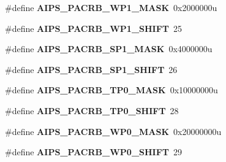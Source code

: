 \begin{DoxyCompactItemize}
\item 
\hypertarget{group___a_i_p_s___register___masks_gadd63112c58fb22cde7130bf7a0aec3d2}{}\#define {\bfseries A\+I\+P\+S\+\_\+\+P\+A\+C\+R\+B\+\_\+\+W\+P1\+\_\+\+M\+A\+S\+K}~0x2000000u\label{group___a_i_p_s___register___masks_gadd63112c58fb22cde7130bf7a0aec3d2}

\item 
\hypertarget{group___a_i_p_s___register___masks_ga3b3e2ec4b285ab5b5ce6667a05ef7ad1}{}\#define {\bfseries A\+I\+P\+S\+\_\+\+P\+A\+C\+R\+B\+\_\+\+W\+P1\+\_\+\+S\+H\+I\+F\+T}~25\label{group___a_i_p_s___register___masks_ga3b3e2ec4b285ab5b5ce6667a05ef7ad1}

\item 
\hypertarget{group___a_i_p_s___register___masks_gaf2eb0bc5160930c4b4e1a45f98267785}{}\#define {\bfseries A\+I\+P\+S\+\_\+\+P\+A\+C\+R\+B\+\_\+\+S\+P1\+\_\+\+M\+A\+S\+K}~0x4000000u\label{group___a_i_p_s___register___masks_gaf2eb0bc5160930c4b4e1a45f98267785}

\item 
\hypertarget{group___a_i_p_s___register___masks_gacd1757a9bf7adb1995c5e5ffebd7b9b8}{}\#define {\bfseries A\+I\+P\+S\+\_\+\+P\+A\+C\+R\+B\+\_\+\+S\+P1\+\_\+\+S\+H\+I\+F\+T}~26\label{group___a_i_p_s___register___masks_gacd1757a9bf7adb1995c5e5ffebd7b9b8}

\item 
\hypertarget{group___a_i_p_s___register___masks_ga06911e10e7c4fb7a6efe6ec5c2234521}{}\#define {\bfseries A\+I\+P\+S\+\_\+\+P\+A\+C\+R\+B\+\_\+\+T\+P0\+\_\+\+M\+A\+S\+K}~0x10000000u\label{group___a_i_p_s___register___masks_ga06911e10e7c4fb7a6efe6ec5c2234521}

\item 
\hypertarget{group___a_i_p_s___register___masks_gadfe5ca43a0feeca2dec0c39051c9c2e2}{}\#define {\bfseries A\+I\+P\+S\+\_\+\+P\+A\+C\+R\+B\+\_\+\+T\+P0\+\_\+\+S\+H\+I\+F\+T}~28\label{group___a_i_p_s___register___masks_gadfe5ca43a0feeca2dec0c39051c9c2e2}

\item 
\hypertarget{group___a_i_p_s___register___masks_gab296240a3309bbec807d04984f43afc7}{}\#define {\bfseries A\+I\+P\+S\+\_\+\+P\+A\+C\+R\+B\+\_\+\+W\+P0\+\_\+\+M\+A\+S\+K}~0x20000000u\label{group___a_i_p_s___register___masks_gab296240a3309bbec807d04984f43afc7}

\item 
\hypertarget{group___a_i_p_s___register___masks_ga92ba26e1b70a4103215a4843f8682bb6}{}\#define {\bfseries A\+I\+P\+S\+\_\+\+P\+A\+C\+R\+B\+\_\+\+W\+P0\+\_\+\+S\+H\+I\+F\+T}~29\label{group___a_i_p_s___register___masks_ga92ba26e1b70a4103215a4843f8682bb6}


\end{DoxyCompactItemize}
